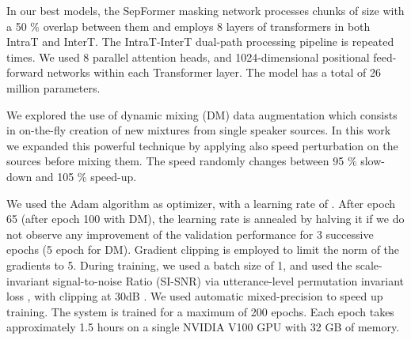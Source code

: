 \documentclass{article}
\begin{document}
In our best models, the SepFormer masking network processes chunks of size  with a 50 \% overlap between them and employs 8 layers of transformers in both IntraT and InterT. The IntraT-InterT dual-path processing pipeline is repeated  times. We used 8 parallel attention heads, and 1024-dimensional positional feed-forward networks within each Transformer layer. The model has a total of 26 million parameters. 
 

\newcommand{\dataaug}{DM}
We explored the use of dynamic mixing (DM) data augmentation \cite{zeghidour2020wavesplit} which consists in on-the-fly creation of new mixtures from single speaker sources. In this work we expanded this powerful technique by applying also speed perturbation on the sources before mixing them. The speed randomly changes between 95 \% slow-down and 105 \% speed-up.





We used the Adam algorithm \cite{kingma2017adam} as optimizer, with a learning rate of . After epoch 65 (after epoch 100 with \dataaug), the learning rate is annealed by halving it if we do not observe any improvement of the validation performance for 3 successive epochs (5 epoch for \dataaug). Gradient clipping is employed to limit the  norm of the gradients to 5. During training, we used a batch size of 1, and used the scale-invariant signal-to-noise Ratio (SI-SNR) \cite{le2019sdr} via utterance-level permutation invariant loss \cite{kolbaek2017multitalker}, with clipping at 30dB \cite{zeghidour2020wavesplit}. We used automatic mixed-precision to speed up training. The system is trained for a maximum of 200 epochs. Each epoch takes approximately 1.5 hours on a single NVIDIA V100 GPU with 32 GB of memory.  

\vspace{-0.3cm}
\end{document}
